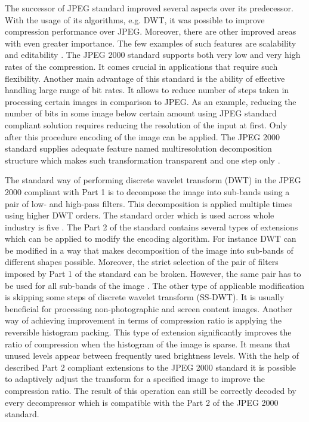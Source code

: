 The successor of JPEG standard improved several aspects over its predecessor. With the usage of its algorithms,
e.g. DWT, it was possible to improve compression performance over JPEG. Moreover, there are other improved areas
with even greater importance. The few examples of such features are scalability and editability \cite{jpeg2000}.
The JPEG 2000 standard supports both very low and very high rates of the compression. It comes crucial
in applications that require such flexibility. Another main advantage of this standard is the ability of
effective handling large range of bit rates. It allows to reduce number of steps taken in processing
certain images in comparison to JPEG. As an example, reducing the number of bits in some image below certain
amount using JPEG standard compliant solution requires reducing the resolution of the input at first.
Only after this procedure encoding of the image can be applied. The JPEG 2000 standard supplies adequate feature
named multiresolution decomposition structure which makes such transformation transparent and one step only \cite{jpeg2000}.

The standard way of performing discrete wavelet transform (DWT) in the JPEG 2000 compliant with Part 1 is to decompose
the image into sub-bands using a pair of low- and high-pass filters. This decomposition is applied multiple times using
higher DWT orders. The standard order which is used across whole industry is five \cite{jpeg_suite} \cite{jpeg_summary}.
The Part 2 of the standard contains several types of extensions which can be applied to modify the encoding
algorithm. For instance DWT can be modified in a way that makes decomposition of the image into sub-bands of different
shapes possible. Moreover, the strict selection of the pair of filters imposed by Part 1 of the standard can be
broken. However, the same pair has to be used for all sub-bands of the image \cite{jpeg_suite}. The other type of applicable
modification is skipping some steps of discrete wavelet transform (SS-DWT). It is usually beneficial for processing
non-photographic and screen content images. Another way of achieving improvement in terms of compression ratio is
applying the reversible histogram packing. This type of extension significantly improves the ratio of compression
when the histogram of the image is sparse. It means that unused levels appear between frequently used brightness levels.
With the help of described Part 2 compliant extensions to the JPEG 2000 standard it is possible to adaptively
adjust the transform for a specified image to improve the compression ratio. The result of this operation can still
be correctly decoded by every decompressor which is compatible with the Part 2 of the JPEG 2000 standard.

